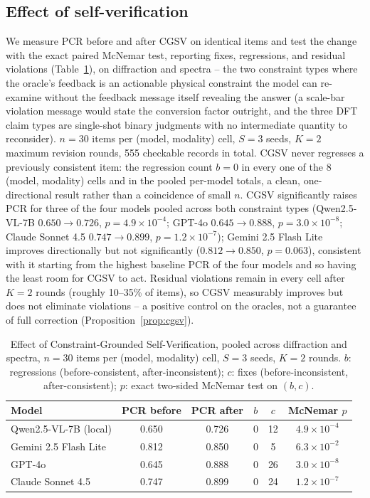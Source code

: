 \documentclass[pdflatex,sn-nature]{sn-jnl}
\begin{document}
\subsection*{Effect of self-verification}
We measure PCR before and after CGSV on identical items and test the change with the
exact paired McNemar test, reporting fixes, regressions, and residual violations
(Table~\ref{tab:cgsv}), on diffraction and spectra -- the two constraint types where
the oracle's feedback is an actionable physical constraint the model can re-examine
without the feedback message itself revealing the answer (a scale-bar violation
message would state the conversion factor outright, and the three DFT claim types are
single-shot binary judgments with no intermediate quantity to reconsider). $n=30$
items per (model, modality) cell, $S=3$ seeds, $K=2$ maximum revision rounds, 555
checkable records in total. CGSV never regresses a previously consistent item: the
regression count $b=0$ in every one of the 8 (model, modality) cells and in the pooled
per-model totals, a clean, one-directional result rather than a coincidence of small
$n$. CGSV significantly raises PCR for three of the four models pooled across both
constraint types (Qwen2.5-VL-7B $0.650\!\to\!0.726$, $p=4.9\times10^{-4}$; GPT-4o
$0.645\!\to\!0.888$, $p=3.0\times10^{-8}$; Claude Sonnet 4.5 $0.747\!\to\!0.899$,
$p=1.2\times10^{-7}$); Gemini 2.5 Flash Lite improves directionally but not
significantly ($0.812\!\to\!0.850$, $p=0.063$), consistent with it starting from the
highest baseline PCR of the four models and so having the least room for CGSV to act.
Residual violations remain in every cell after $K=2$ rounds (roughly 10--35\% of
items), so CGSV measurably improves but does not eliminate violations -- a positive
control on the oracles, not a guarantee of full correction (Proposition~\ref{prop:cgsv}).

\begin{table}[t]
\centering
\caption{Effect of Constraint-Grounded Self-Verification, pooled across diffraction
and spectra, $n=30$ items per (model, modality) cell, $S=3$ seeds, $K=2$ rounds. $b$:
regressions (before-consistent, after-inconsistent); $c$: fixes
(before-inconsistent, after-consistent); $p$: exact two-sided McNemar test on $(b,c)$.}
\label{tab:cgsv}
{\scriptsize\setlength{\tabcolsep}{4pt}
\begin{tabular}{lccccc}
\toprule
Model & PCR before & PCR after & $b$ & $c$ & McNemar $p$ \\
\midrule
Qwen2.5-VL-7B (local) & 0.650 & 0.726 & 0 & 12 & $4.9\times10^{-4}$ \\
Gemini 2.5 Flash Lite & 0.812 & 0.850 & 0 & 5  & $6.3\times10^{-2}$ \\
GPT-4o                & 0.645 & 0.888 & 0 & 26 & $3.0\times10^{-8}$ \\
Claude Sonnet 4.5     & 0.747 & 0.899 & 0 & 24 & $1.2\times10^{-7}$ \\
\bottomrule
\end{tabular}}
\end{table}
\end{document}
